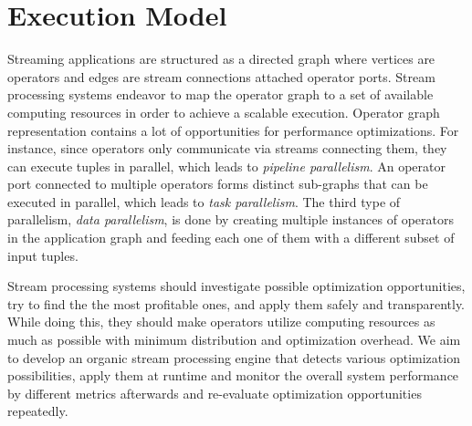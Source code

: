 \section{Execution Model}\label{sec:execution-model}

Streaming applications are structured as a directed graph where vertices are operators and edges are stream connections attached operator ports. Stream processing systems endeavor to map the operator graph to a set of available computing resources in order to achieve a scalable execution. Operator graph representation contains a lot of opportunities for performance optimizations. For instance, since operators only communicate via streams connecting them, they can execute tuples in parallel, which leads to \textit{pipeline parallelism}. An operator port connected to multiple operators forms distinct sub-graphs that can be executed in parallel, which leads to \textit{task parallelism}. The third type of parallelism, \textit{data parallelism}, is done by creating multiple instances of operators in the application graph and feeding each one of them with a different subset of input tuples. 

Stream processing systems should investigate possible optimization opportunities, try to find the the most profitable ones, and apply them safely and transparently. While doing this, they should make operators utilize computing resources as much as possible with minimum distribution and optimization overhead. We aim to develop an organic stream processing engine that detects various optimization possibilities, apply them at runtime and monitor the overall system performance by different metrics afterwards and re-evaluate optimization opportunities repeatedly. 

